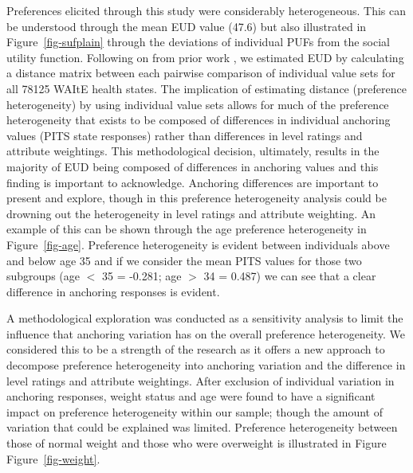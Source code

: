 \documentclass[
  number,
  preprint]{elsarticle}
\begin{document}
Preferences elicited through this study were considerably heterogeneous.
This can be understood through the mean EUD value (47.6) but also
illustrated in Figure~\ref{fig-sufplain} through the deviations of
individual PUFs from the social utility function. Following on from
prior work \citep{Schneider2024ExploringLevel}, we estimated EUD by
calculating a distance matrix between each pairwise comparison of
individual value sets for all 78125 WAItE health states. The implication
of estimating distance (preference heterogeneity) by using individual
value sets allows for much of the preference heterogeneity that exists
to be composed of differences in individual anchoring values (PITS state
responses) rather than differences in level ratings and attribute
weightings. This methodological decision, ultimately, results in the
majority of EUD being composed of differences in anchoring values and
this finding is important to acknowledge. Anchoring differences are
important to present and explore, though in this preference
heterogeneity analysis could be drowning out the heterogeneity in level
ratings and attribute weighting. An example of this can be shown through
the age preference heterogeneity in Figure~\ref{fig-age}. Preference
heterogeneity is evident between individuals above and below age 35 and
if we consider the mean PITS values for those two subgroups (age \(<\)
35 = -0.281; age \(>\) 34 = 0.487) we can see that a clear difference in
anchoring responses is evident.

A methodological exploration was conducted as a sensitivity analysis to
limit the influence that anchoring variation has on the overall
preference heterogeneity. We considered this to be a strength of the
research as it offers a new approach to decompose preference
heterogeneity into anchoring variation and the difference in level
ratings and attribute weightings. After exclusion of individual
variation in anchoring responses, weight status and age were found to
have a significant impact on preference heterogeneity within our sample;
though the amount of variation that could be explained was limited.
Preference heterogeneity between those of normal weight and those who
were overweight is illustrated in Figure Figure~\ref{fig-weight}.
\end{document}
